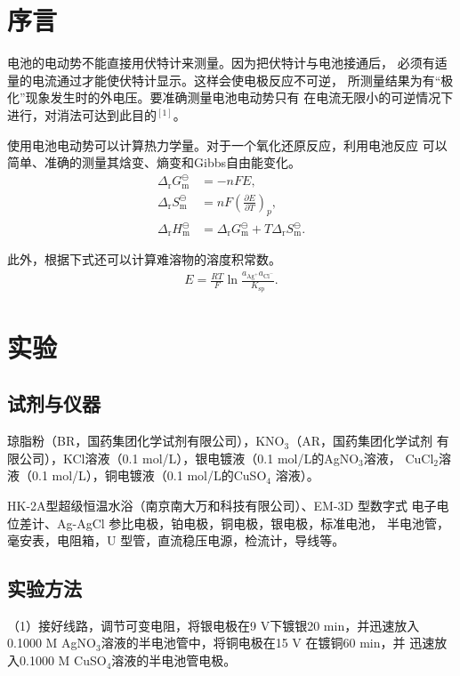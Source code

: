 \documentclass[12pt]{ctexart}
\numberwithin{equation}{section}
\begin{document}
\section{序言}
电池的电动势不能直接用伏特计来测量。因为把伏特计与电池接通后，
必须有适量的电流通过才能使伏特计显示。这样会使电极反应不可逆，
所测量结果为有“极化”现象发生时的外电压。要准确测量电池电动势只有
在电流无限小的可逆情况下进行，对消法可达到此目的$^{[1]}$。

使用电池电动势可以计算热力学量。对于一个氧化还原反应，利用电池反应
可以简单、准确的测量其焓变、熵变和Gibbs自由能变化。
\begin{align}
    \Delta_{\text{r}} G_{\text{m}}^{\ominus} &= -nFE, \\
    \Delta_{\text{r}} S_{\text{m}}^{\ominus}
        &= nF\left(\frac{\partial E}{\partial T}\right)_p, \\
    \Delta_{\text{r}} H_{\text{m}}^{\ominus}
        &= \Delta_{\text{r}} G_{\text{m}}^{\ominus}
        + T \Delta_{\text{r}} S_{\text{m}}^{\ominus}.
\end{align}

此外，根据下式还可以计算难溶物的溶度积常数。
\begin{align}
    E = \frac{RT}{F}
    \ln\frac{a_{\mathrm{Ag^+}}a_{\mathrm{Cl^-}}}
        {K_{\text{sp}}}.
\end{align}

\section{实验}
\subsection{试剂与仪器}
琼脂粉（BR，国药集团化学试剂有限公司），KNO$_3$（AR，国药集团化学试剂
有限公司），KCl溶液（0.1 mol/L），银电镀液（0.1 mol/L的AgNO$_3$溶液，
CuCl$_2$溶液（0.1 mol/L），铜电镀液（0.1 mol/L的CuSO$_4$ 溶液）。

HK-2A型超级恒温水浴（南京南大万和科技有限公司）、EM-3D 型数字式
电子电位差计、Ag-AgCl 参比电极，铂电极，铜电极，银电极，标准电池，
半电池管，毫安表，电阻箱，U 型管，直流稳压电源，检流计，导线等。

\subsection{实验方法}
（1）接好线路，调节可变电阻，将银电极在9 V下镀银20 min，并迅速放入
0.1000 M AgNO$_3$溶液的半电池管中，将铜电极在15 V 在镀铜60 min，并
迅速放入0.1000 M CuSO$_4$溶液的半电池管电极。
\end{document}
